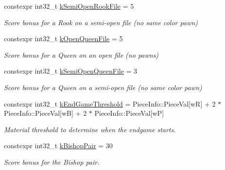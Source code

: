 \begin{DoxyCompactItemize}
\mbox{\label{namespaceValue_a81946dee27fcd0bd24d914082169be38}} 
constexpr int32\+\_\+t \mbox{\hyperlink{namespaceValue_a81946dee27fcd0bd24d914082169be38}{k\+Semi\+Open\+Rook\+File}} = 5
\begin{DoxyCompactList}\small\item\em Score bonus for a Rook on a semi-\/open file (no same color pawn) \end{DoxyCompactList}\item 
\mbox{\label{namespaceValue_a1b62aec2245b0434f86252680fe2d837}} 
constexpr int32\+\_\+t \mbox{\hyperlink{namespaceValue_a1b62aec2245b0434f86252680fe2d837}{k\+Open\+Queen\+File}} = 5
\begin{DoxyCompactList}\small\item\em Score bonus for a Queen on an open file (no pawns) \end{DoxyCompactList}\item 
\mbox{\label{namespaceValue_a4d8e9e3283f0dfb8767defd3c4375bf9}} 
constexpr int32\+\_\+t \mbox{\hyperlink{namespaceValue_a4d8e9e3283f0dfb8767defd3c4375bf9}{k\+Semi\+Open\+Queen\+File}} = 3
\begin{DoxyCompactList}\small\item\em Score bonus for a Queen on a semi-\/open file (no same color pawn) \end{DoxyCompactList}\item 
\mbox{\label{namespaceValue_aba807f233f0cb45bc9479d3b2697450b}} 
constexpr int32\+\_\+t \mbox{\hyperlink{namespaceValue_aba807f233f0cb45bc9479d3b2697450b}{k\+End\+Game\+Threshold}} = Piece\+Info\+::\+Piece\+Val\mbox{[}wR\mbox{]} + 2 $\ast$ Piece\+Info\+::\+Piece\+Val\mbox{[}wB\mbox{]} + 2 $\ast$ Piece\+Info\+::\+Piece\+Val\mbox{[}wP\mbox{]}
\begin{DoxyCompactList}\small\item\em Material threshold to determine when the endgame starts. \end{DoxyCompactList}\item 
\mbox{\label{namespaceValue_a662b268cafa7fb0924985d533150c6c2}} 
constexpr int32\+\_\+t \mbox{\hyperlink{namespaceValue_a662b268cafa7fb0924985d533150c6c2}{k\+Bishop\+Pair}} = 30
\begin{DoxyCompactList}\small\item\em Score bonus for the Bishop pair. \end{DoxyCompactList}\item 

\end{DoxyCompactItemize}
